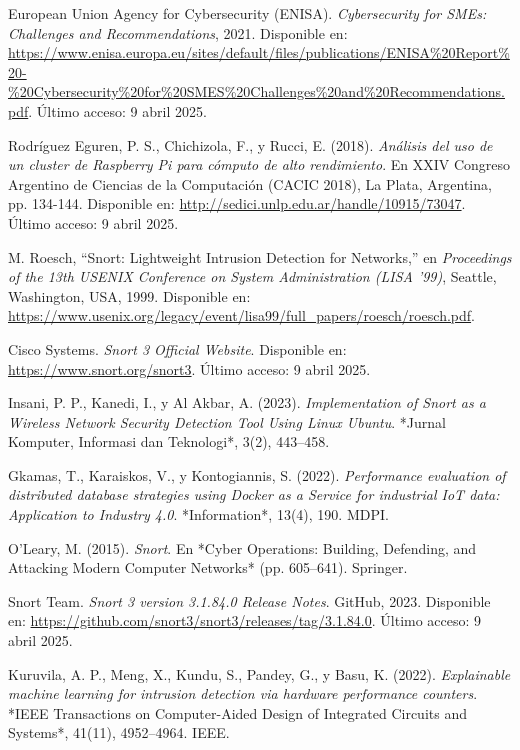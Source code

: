 \documentclass[11pt,a4paper,twoside]{report}
\begin{document}
\begin{thebibliography}{35}
		
	European Union Agency for Cybersecurity (ENISA). \textit{Cybersecurity for SMEs: Challenges and Recommendations}, 2021. Disponible en: \url{https://www.enisa.europa.eu/sites/default/files/publications/ENISA%20Report%20-%20Cybersecurity%20for%20SMES%20Challenges%20and%20Recommendations.pdf}. Último acceso: 9 abril 2025.
	
	Rodríguez Eguren, P. S., Chichizola, F., y Rucci, E. (2018). \textit{Análisis del uso de un cluster de Raspberry Pi para cómputo de alto rendimiento}. En XXIV Congreso Argentino de Ciencias de la Computación (CACIC 2018), La Plata, Argentina, pp. 134-144. Disponible en: \url{http://sedici.unlp.edu.ar/handle/10915/73047}. Último acceso: 9 abril 2025.
	
	M. Roesch, ``Snort: Lightweight Intrusion Detection for Networks,'' en \textit{Proceedings of the 13th USENIX Conference on System Administration (LISA '99)}, Seattle, Washington, USA, 1999. Disponible en: \url{https://www.usenix.org/legacy/event/lisa99/full_papers/roesch/roesch.pdf}.
	
	Cisco Systems. \textit{Snort 3 Official Website}. Disponible en: \url{https://www.snort.org/snort3}. Último acceso: 9 abril 2025.
	
	Insani, P. P., Kanedi, I., y Al Akbar, A. (2023). \textit{Implementation of Snort as a Wireless Network Security Detection Tool Using Linux Ubuntu}. *Jurnal Komputer, Informasi dan Teknologi*, 3(2), 443--458.
	
	Gkamas, T., Karaiskos, V., y Kontogiannis, S. (2022). \textit{Performance evaluation of distributed database strategies using Docker as a Service for industrial IoT data: Application to Industry 4.0}. *Information*, 13(4), 190. MDPI.
	
	O'Leary, M. (2015). \textit{Snort}. En *Cyber Operations: Building, Defending, and Attacking Modern Computer Networks* (pp. 605--641). Springer.
	
	Snort Team. \textit{Snort 3 version 3.1.84.0 Release Notes}. GitHub, 2023. Disponible en: \url{https://github.com/snort3/snort3/releases/tag/3.1.84.0}. Último acceso: 9 abril 2025.
	
	Kuruvila, A. P., Meng, X., Kundu, S., Pandey, G., y Basu, K. (2022). \textit{Explainable machine learning for intrusion detection via hardware performance counters}. *IEEE Transactions on Computer-Aided Design of Integrated Circuits and Systems*, 41(11), 4952--4964. IEEE.
	

\end{thebibliography}
\end{document}
